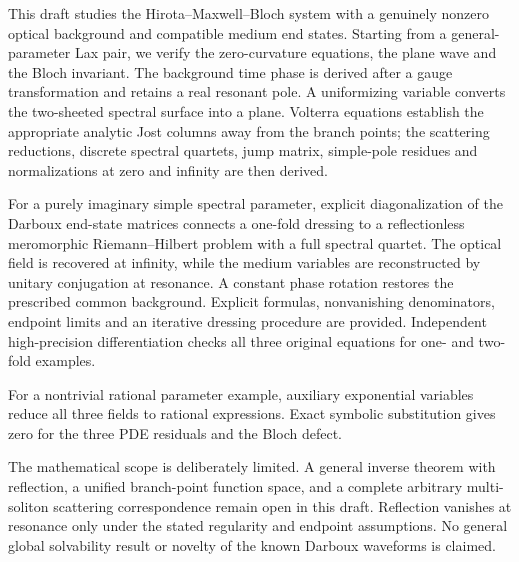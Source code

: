 \begin{abstract*}
This draft studies the Hirota--Maxwell--Bloch system with a genuinely nonzero optical background and compatible medium end states. Starting from a general-parameter Lax pair, we verify the zero-curvature equations, the plane wave and the Bloch invariant. The background time phase is derived after a gauge transformation and retains a real resonant pole. A uniformizing variable converts the two-sheeted spectral surface into a plane. Volterra equations establish the appropriate analytic Jost columns away from the branch points; the scattering reductions, discrete spectral quartets, jump matrix, simple-pole residues and normalizations at zero and infinity are then derived.

For a purely imaginary simple spectral parameter, explicit diagonalization of the Darboux end-state matrices connects a one-fold dressing to a reflectionless meromorphic Riemann--Hilbert problem with a full spectral quartet. The optical field is recovered at infinity, while the medium variables are reconstructed by unitary conjugation at resonance. A constant phase rotation restores the prescribed common background. Explicit formulas, nonvanishing denominators, endpoint limits and an iterative dressing procedure are provided. Independent high-precision differentiation checks all three original equations for one- and two-fold examples.

For a nontrivial rational parameter example, auxiliary exponential variables reduce all three fields to rational expressions. Exact symbolic substitution gives zero for the three PDE residuals and the Bloch defect.

The mathematical scope is deliberately limited. A general inverse theorem with reflection, a unified branch-point function space, and a complete arbitrary multi-soliton scattering correspondence remain open in this draft. Reflection vanishes at resonance only under the stated regularity and endpoint assumptions. No general global solvability result or novelty of the known Darboux waveforms is claimed.
\end{abstract*}
\tableofcontents
